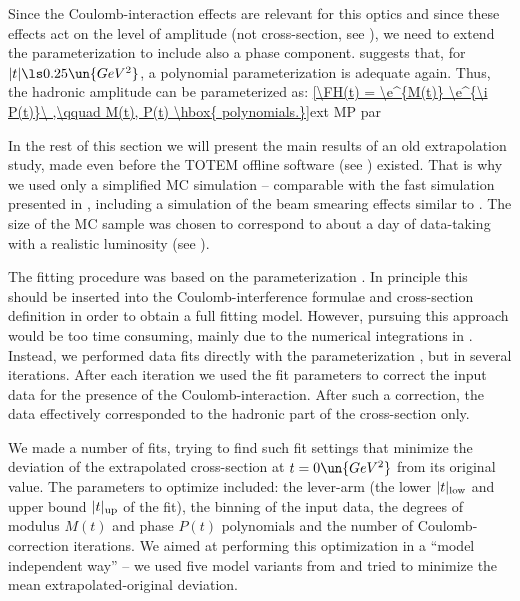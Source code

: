 \def\OutlineLabel{Extrapolation for be* = 1535 m optics}

Since the Coulomb-interaction effects are relevant for this optics and since these effects act on the level of amplitude (not cross-section, see ), we need to extend the parameterization  to include also a phase component.  suggests that, for $|t| \ls 0.25\un{GeV^2}$, a polynomial parameterization is adequate again. Thus, the hadronic amplitude can be parameterized as:
\eqref{\FH(t) = \e^{M(t)} \e^{\i P(t)}\ ,\qquad M(t), P(t) \hbox{ polynomials.}}{ext MP par}

In the rest of this section we will present the main results of an old extrapolation study, made even before the TOTEM offline software (see ) existed. That is why we used only a simplified MC simulation -- comparable with the fast simulation presented in , including a simulation of the beam smearing effects similar to . The size of the MC sample was chosen to correspond to about a day of data-taking with a realistic luminosity (see ).

The fitting procedure was based on the parameterization . In principle this should be inserted into the Coulomb-interference formulae  and cross-section definition  in order to obtain a full fitting model. However, pursuing this approach would be too time consuming, mainly due to the numerical integrations in . Instead, we performed data fits directly with the parameterization , but in several iterations. After each iteration we used the fit parameters to correct the input data for the presence of the Coulomb-interaction. After such a correction, the data effectively corresponded to the hadronic part of the cross-section only.


We made a number of fits, trying to find such fit settings that minimize the deviation of the extrapolated cross-section at $t=0\un{GeV^2}$ from its original value. The parameters to optimize included: the lever-arm (the lower $|t|_{\rm low}$ and upper bound $|t|_{\rm up}$ of the fit), the binning of the input data, the degrees of modulus $M(t)$ and phase $P(t)$ polynomials and the number of Coulomb-correction iterations. We aimed at performing this optimization in a ``model independent way'' -- we used five model variants from  and tried to minimize the mean extrapolated-original deviation.

